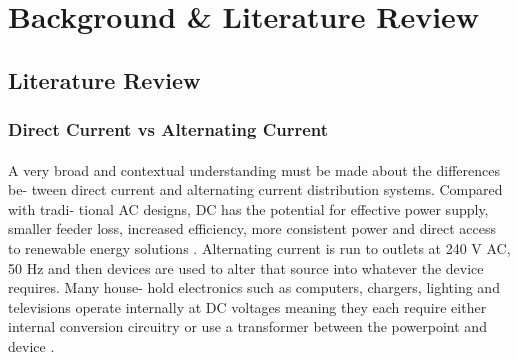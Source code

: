 
\section{Background \& Literature Review}



\subsection{Literature Review}

\subsubsection{Direct Current vs Alternating Current}

\paragraph{}
A very broad and contextual understanding must be made about the differences be-
tween direct current and alternating current distribution systems. Compared with tradi-
tional AC designs, DC has the potential for effective power supply, smaller feeder
loss, increased efficiency, more consistent power and direct access to renewable
energy solutions \cite{Liu2014}. Alternating current is run to outlets at 240 V AC, 50 \si{Hz} and then devices are used to alter that source into whatever the device requires. Many house-
hold electronics such as computers, chargers, lighting and televisions operate internally
at DC voltages meaning they each require either internal conversion circuitry or use a
transformer between the powerpoint and device \cite{Paajanen2009}.

